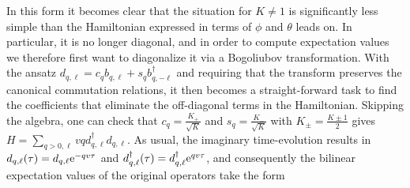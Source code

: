 In this form it becomes clear that the situation for $K\neq 1$ is significantly less simple than the Hamiltonian expressed in terms of $\phi$ and $\theta$ leads on.
In particular, it is no longer diagonal, and in order to compute expectation values we therefore first want to diagonalize it via a Bogoliubov transformation.
With the ansatz $d_{q,\ell} = c_q b_{q,\ell} + s_q b_{q,-\ell}^\dagger$ and requiring that the transform preserves the canonical commutation relations, it then becomes a straight-forward task to find the coefficients that eliminate the off-diagonal terms in the Hamiltonian.
Skipping the algebra, one can check that $c_q = \frac{K_+}{\sqrt{K}}$ and $s_q = \frac{K_-}{\sqrt{K}}$ with $K_\pm = \frac{K\pm 1}{2}$ gives $H=\sum_{q>0,\ell} vqd_{q,\ell}^\dagger d_{q,\ell}$.
As usual, the imaginary time-evolution results in $d_{q,\ell}(\tau) = d_{q,\ell} \text{e}^{-qv\tau}$ and $d_{q,\ell}^\dagger(\tau) = d_{q,\ell}^\dagger \text{e}^{qv\tau}$, and consequently the bilinear expectation values of the original operators take the form
